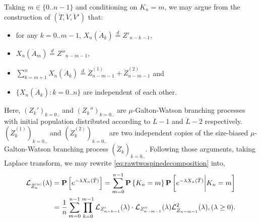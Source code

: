 \documentclass[12pt]{amsart}
\theoremstyle{remark}
\numberwithin{equation}{section}
\newcommand{\prob}{\mathbf P}
\newcommand{\brac}[1]{\left[ #1 \right]}
\newcommand{\set}[1]{\left\{ #1 \right\}}
\newcommand{\eqlaw}{\overset{d}{=}}
\begin{document}
	Taking $m\in\{0..n-1\}$ and conditioning on $K_n=m$, we may argue from the construction of $(\ddot T,\ddot V,\ddot V')$ that:
\begin{itemize}
\item
    for any $k=0..m-1$, $X_n(\ddot A_k)\eqlaw Z'_{n-k-1}$,
\item
    $X_n(\ddot A_m)\eqlaw Z''_{n-m-1}$,
\item 
    $\sum_{k=m+1}^nX_n(\ddot A_k)\eqlaw \dot Z_{n-m-1}^{(1)}+\dot Z_{n-m-1}^{(2)}$ and
\item
    $\{X_n(\ddot A_k):k=0..n\}$ are independent of each other.
\end{itemize}
    Here, $(Z_k')_{k=0..}$ and $(Z_k'')_{k=0..}$ are $\mu$-Galton-Watson branching processes with initial population distributed according to $\dot L-1$ and $\ddot L-2$ respectively. $(\dot Z_k^{(1)})_{k=0..}$ and $(\dot Z_k^{(2)})_{k=0..}$ are two independent copies of the size-biased $\mu$-Galton-Watson branching process $(\dot Z_k)_{k=0..}$. Following those arguments, taking Laplace transform, we may rewrite \eqref{eq:rawtwospinedecomposition} into,
\begin{equation}
\label{eq:laplacetransformationoftwospinedecomposition}
\begin{split}
		\cL_{\ddot Z_n^{(n)}}(\lambda)
	&=
		\prob\brac{e^{-\lambda X_n(\ddot T)}}
	= 
	    \sum_{m=0}^{n-1}\prob\set{K_n=m}\prob\brac{e^{-\lambda X_n(\ddot T)}\bigg| K_n=m}
	\\&=
        \frac{1}{n}\sum_{m=0}^{n-1}\prod_{k=0}^{m-1}\cL_{Z'_{n-k-1}}(\lambda)
    \cdot
        \cL_{Z''_{n-m-1}}(\lambda)\cL_{\dot Z_{n-m-1}}^2(\lambda)
    ,(\lambda\geq 0).
\end{split}
\end{equation}
\end{document}
